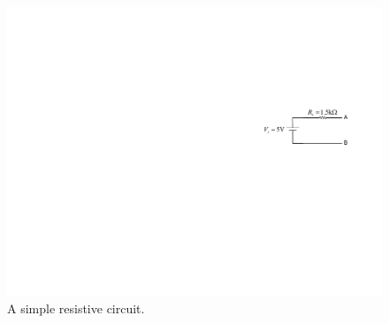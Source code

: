 \documentclass[11pt]{article}
\begin{document}
\begin{question}


    \begin{figure}[H]
        \centering
        \includegraphics[scale=1.2,angle=0]{Fig/cir3.pdf}
        \caption{A simple resistive circuit.} \label{fig:cir3}
    \end{figure}



\end{question}
\end{document}
